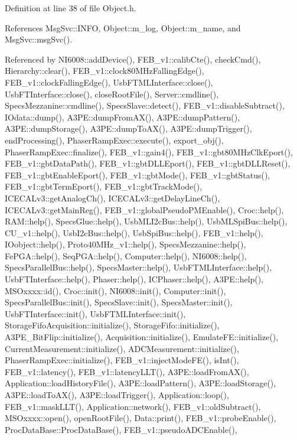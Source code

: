Definition at line 38 of file Object.\+h.



References Msg\+Svc\+::\+I\+N\+FO, Object\+::m\+\_\+log, Object\+::m\+\_\+name, and Msg\+Svc\+::msg\+Svc().



Referenced by N\+I6008\+::add\+Device(), F\+E\+B\+\_\+v1\+::calib\+Cte(), check\+Cmd(), Hierarchy\+::clear(), F\+E\+B\+\_\+v1\+::clock80\+M\+Hz\+Falling\+Edge(), F\+E\+B\+\_\+v1\+::clock\+Falling\+Edge(), Usb\+F\+T\+M\+L\+Interface\+::close(), Usb\+F\+T\+Interface\+::close(), close\+Root\+File(), Server\+::cmdline(), Specs\+Mezzanine\+::cmdline(), Specs\+Slave\+::detect(), F\+E\+B\+\_\+v1\+::disable\+Subtract(), I\+Odata\+::dump(), A3\+P\+E\+::dump\+From\+A\+X(), A3\+P\+E\+::dump\+Pattern(), A3\+P\+E\+::dump\+Storage(), A3\+P\+E\+::dump\+To\+A\+X(), A3\+P\+E\+::dump\+Trigger(), end\+Processing(), Phaser\+Ramp\+Exec\+::execute(), export\+\_\+obj(), Phaser\+Ramp\+Exec\+::finalize(), F\+E\+B\+\_\+v1\+::gain4(), F\+E\+B\+\_\+v1\+::gbt80\+M\+Hz\+Clk\+Eport(), F\+E\+B\+\_\+v1\+::gbt\+Data\+Path(), F\+E\+B\+\_\+v1\+::gbt\+D\+L\+L\+Eport(), F\+E\+B\+\_\+v1\+::gbt\+D\+L\+L\+Reset(), F\+E\+B\+\_\+v1\+::gbt\+Enable\+Eport(), F\+E\+B\+\_\+v1\+::gbt\+Mode(), F\+E\+B\+\_\+v1\+::gbt\+Status(), F\+E\+B\+\_\+v1\+::gbt\+Term\+Eport(), F\+E\+B\+\_\+v1\+::gbt\+Track\+Mode(), I\+C\+E\+C\+A\+Lv3\+::get\+Analog\+Ch(), I\+C\+E\+C\+A\+Lv3\+::get\+Delay\+Line\+Ch(), I\+C\+E\+C\+A\+Lv3\+::get\+Main\+Reg(), F\+E\+B\+\_\+v1\+::global\+Pseudo\+P\+M\+Enable(), Croc\+::help(), R\+A\+M\+::help(), Specs\+Glue\+::help(), Usb\+M\+L\+I2c\+Bus\+::help(), Usb\+M\+L\+Spi\+Bus\+::help(), C\+U\+\_\+v1\+::help(), Usb\+I2c\+Bus\+::help(), Usb\+Spi\+Bus\+::help(), F\+E\+B\+\_\+v1\+::help(), I\+Oobject\+::help(), Proto40\+M\+Hz\+\_\+v1\+::help(), Specs\+Mezzanine\+::help(), Fe\+P\+G\+A\+::help(), Seq\+P\+G\+A\+::help(), Computer\+::help(), N\+I6008\+::help(), Specs\+Parallel\+Bus\+::help(), Specs\+Master\+::help(), Usb\+F\+T\+M\+L\+Interface\+::help(), Usb\+F\+T\+Interface\+::help(), Phaser\+::help(), I\+C\+Phaser\+::help(), A3\+P\+E\+::help(), M\+S\+Oxxxx\+::id(), Croc\+::init(), N\+I6008\+::init(), Computer\+::init(), Specs\+Parallel\+Bus\+::init(), Specs\+Slave\+::init(), Specs\+Master\+::init(), Usb\+F\+T\+Interface\+::init(), Usb\+F\+T\+M\+L\+Interface\+::init(), Storage\+Fifo\+Acquisition\+::initialize(), Storage\+Fifo\+::initialize(), A3\+P\+E\+\_\+\+Bit\+Flip\+::initialize(), Acquisition\+::initialize(), Emulate\+F\+E\+::initialize(), Current\+Measurement\+::initialize(), A\+D\+C\+Measurement\+::initialize(), Phaser\+Ramp\+Exec\+::initialize(), F\+E\+B\+\_\+v1\+::inject\+Mode\+F\+E(), is\+Int(), F\+E\+B\+\_\+v1\+::latency(), F\+E\+B\+\_\+v1\+::latency\+L\+L\+T(), A3\+P\+E\+::load\+From\+A\+X(), Application\+::load\+History\+File(), A3\+P\+E\+::load\+Pattern(), A3\+P\+E\+::load\+Storage(), A3\+P\+E\+::load\+To\+A\+X(), A3\+P\+E\+::load\+Trigger(), Application\+::loop(), F\+E\+B\+\_\+v1\+::mask\+L\+L\+T(), Application\+::network(), F\+E\+B\+\_\+v1\+::old\+Subtract(), M\+S\+Oxxxx\+::open(), open\+Root\+File(), Data\+::print(), F\+E\+B\+\_\+v1\+::probe\+Enable(), Proc\+Data\+Base\+::\+Proc\+Data\+Base(), F\+E\+B\+\_\+v1\+::pseudo\+A\+D\+C\+Enable(), 